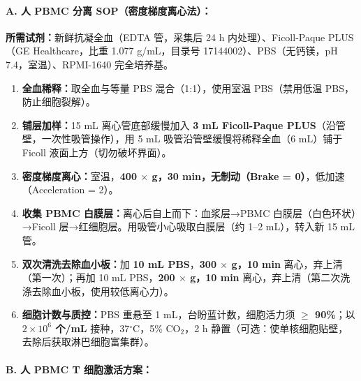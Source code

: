 \documentclass[12pt,a4paper,twoside]{article}
\begin{document}
\paragraph{A. 人 PBMC 分离 SOP（密度梯度离心法）：}

\textbf{所需试剂：}新鲜抗凝全血（EDTA 管，采集后 24 h 内处理）、Ficoll-Paque PLUS（GE Healthcare，比重 1.077 g/mL，目录号 17144002）、PBS（无钙镁，pH 7.4，室温）、RPMI-1640 完全培养基。

\begin{enumerate}
  \item \textbf{全血稀释：}取全血与等量 PBS 混合（1:1），使用室温 PBS（禁用低温 PBS，防止细胞裂解）。
  \item \textbf{铺层加样：}15 mL 离心管底部缓慢加入 \textbf{3 mL Ficoll-Paque PLUS}（沿管壁，一次性吸管操作），用 5 mL 吸管沿管壁缓慢将稀释全血（6 mL）铺于 Ficoll 液面上方（切勿破坏界面）。
  \item \textbf{密度梯度离心：}室温，\textbf{400 $\times$ g，30 min，无制动（Brake = 0）}，低加速（Acceleration = 2）。
  \item \textbf{收集 PBMC 白膜层：}离心后自上而下：血浆层→PBMC 白膜层（白色环状）→Ficoll 层→红细胞层。用吸管小心吸取白膜层（约 1--2 mL），转入新 15 mL 管。
  \item \textbf{双次清洗去除血小板：}加 \textbf{10 mL PBS}，\textbf{300 $\times$ g，10 min} 离心，弃上清（第一次）；再加 10 mL PBS，\textbf{200 $\times$ g，10 min} 离心，弃上清（第二次洗涤去除血小板，使用较低离心力）。
  \item \textbf{细胞计数与质控：}PBS 重悬至 1 mL，台盼蓝计数，细胞活力须 \textbf{$\geq$ 90\%}；以 \textbf{$2 \times 10^6$ 个/mL} 接种，37$^{\circ}$C，5\% CO$_2$，2 h 静置（可选：使单核细胞贴壁，去除后获取淋巴细胞富集群）。
\end{enumerate}

\paragraph{B. 人 PBMC T 细胞激活方案：}
\end{document}
